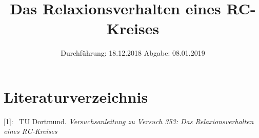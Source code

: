 

\subject{Nr. 353}
\title{Das Relaxionsverhalten eines RC-Kreises}
\date{%
  Durchführung: 18.12.2018
  \hspace{3em}
  Abgabe: 08.01.2019
}



\maketitle
\thispagestyle{empty}
\tableofcontents
\newpage






\printbibliography{}

\section{Literaturverzeichnis}

[1]: \ TU Dortmund. \textit{Versuchsanleitung zu Versuch 353: Das Relaxionsverhalten eines RC-Kreises}\newline


